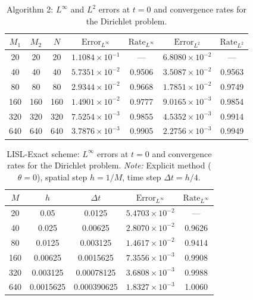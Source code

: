 \documentclass[11pt]{article}
\theoremstyle{mythm}
\theoremstyle{definition}
\begin{document}
	\begin{table}[htb]
		\centering
		\caption{ Algorithm 2: $L^\infty$ and $L^2$ errors at $t=0$ and convergence rates for the Dirichlet problem.}
		\label{tab:dirichlet_symmetric}
		\small
		\begin{tabular}{ccccccc}
			\hline
			$M_1$ & $M_2$ & $N$ & $\text{Error}_{L^{\infty}}$ & $\text{Rate}_{L^{\infty}}$ & $\text{Error}_{L^{2}}$ & $\text{Rate}_{L^{2}}$ \\
			\hline
			20  & 20  & 20  & $1.1084 \times 10^{-1}$ & ---    & $6.8080 \times 10^{-2}$ & ---    \\
			40  & 40  & 40  & $5.7351 \times 10^{-2}$ & 0.9506 & $3.5087 \times 10^{-2}$ & 0.9563 \\
			80  & 80  & 80  & $2.9344 \times 10^{-2}$ & 0.9668 & $1.7851 \times 10^{-2}$ & 0.9749 \\
			160 & 160 & 160 & $1.4901 \times 10^{-2}$ & 0.9777 & $9.0165 \times 10^{-3}$ & 0.9854 \\
			320 & 320 & 320 & $7.5254 \times 10^{-3}$ & 0.9855 & $4.5352 \times 10^{-3}$ & 0.9914 \\
			640 & 640 & 640 & $3.7876 \times 10^{-3}$ & 0.9905 & $2.2756 \times 10^{-3}$ & 0.9949 \\
			\hline
		\end{tabular}
	\end{table}
	
	\begin{table}[htb]
		\centering
		\caption{LISL-Exact scheme: $L^\infty$ errors at $t=0$ and convergence rates for the Dirichlet problem.  
			\emph{Note:} Explicit method ($\theta=0$), spatial step $h=1/M$, time step $\Delta t=h/4$.}
		\label{tab:lisl_exact}
		\small
		\begin{tabular}{ccccc}
			\hline
			$M$ & $h$ & $\Delta t$ & $\text{Error}_{L^{\infty}}$ & $\text{Rate}_{L^{\infty}}$ \\
			\hline
			20  & 0.05       & 0.0125      & $5.4703 \times 10^{-2}$ & ---    \\
			40  & 0.025      & 0.00625     & $2.8070 \times 10^{-2}$ & 0.9626 \\
			80  & 0.0125     & 0.003125    & $1.4617 \times 10^{-2}$ & 0.9414 \\
			160 & 0.00625    & 0.0015625   & $7.3556 \times 10^{-3}$ & 0.9908 \\
			320 & 0.003125   & 0.00078125  & $3.6808 \times 10^{-3}$ & 0.9988 \\
			640 & 0.0015625  & 0.000390625 & $1.8327 \times 10^{-3}$ & 1.0060 \\
			\hline
		\end{tabular}
	\end{table}
	
\end{document}
